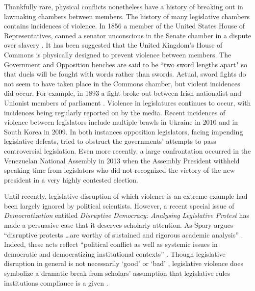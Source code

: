 \documentclass[a4paper]{article}\usepackage{graphicx, color}
\begin{document}
Thankfully rare, physical conflicts nonetheless have a history of breaking out in lawmaking chambers between members. The history of many legislative chambers contains incidences of violence. In 1856 a member of the United States House of Representatives, canned a senator unconscious in the Senate chamber in a dispute over slavery \citep{USSenateCanning}. It has been suggested that the United Kingdom's House of Commons is physically designed to prevent violence between members. The Government and Opposition benches are said to be ``two sword lengths apart" \citep{ParliamentUKSword} so that duels will be fought with words rather than swords. Actual, sword fights do not seem to have taken place in the Commons chamber, but violent incidences did occur. For example, in 1893 a fight broke out between Irish nationalist and Unionist members of parliament \citep{ByrneViolence}. Violence in legislatures continues to occur, with incidences being regularly reported on by the media. Recent incidences of violence between legislators include multiple brawls in Ukraine in 2010 and in South Korea in 2009. In both instances opposition legislators, facing impending legislative defeats, tried to obstruct the governments' attempts to pass controversial legislation. Even more recently, a large confrontation occurred in the Venezuelan National Assembly in 2013 when the Assembly President withheld speaking time from legislators who did not recognized the victory of the new president in a very highly contested election.

Until recently, legislative disruption of which violence is an extreme example had been largely ignored by political scientists. However, a recent special issue of \emph{Democratization} \citeyearpar{Democratization2013} entitled \emph{Disruptive Democracy: Analysing Legislative Protest} has made a persuasive case that it deserves scholarly attention. As Spary argues ``disruptive protests \ldots are worthy of sustained and rigorous academic analysis'' \citeyearpar[393]{Spary2013}. Indeed, these acts reflect ``political conflict as well as systemic issues in democratic and democratizing institutional contexts'' \citep[394-395]{Spary2013}. Though legislative disruption in general is not necessarily `good' or `bad' \citep[see][for discussions of how disruption may be `safety valve' in contexts where disent is strongly curtailed]{Ostrow1996,Young2002}, legislative violence does symbolize a dramatic break from scholars' assumption that legislative rules institutions compliance is a given \cite{Wolfe2004}. 
\end{document}
